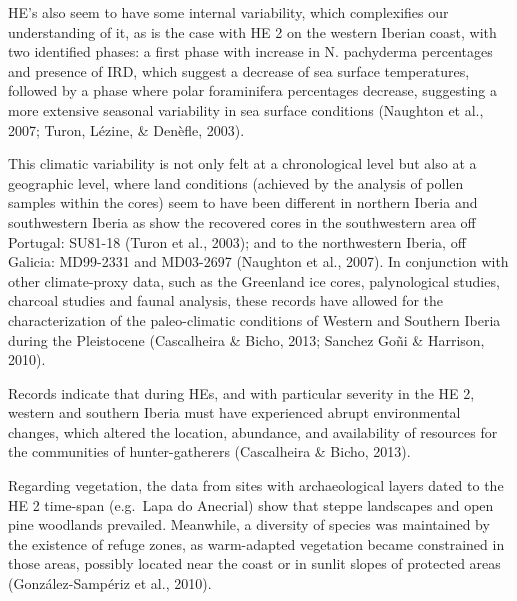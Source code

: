 \documentclass[12pt,twoside]{reedthesis}
\begin{document}
HE's also seem to have some internal variability, which complexifies our understanding of it, as is the case with HE 2 on the western Iberian coast, with two identified phases: a first phase with increase in N. pachyderma percentages and presence of IRD, which suggest a decrease of sea surface temperatures, followed by a phase where polar foraminifera percentages decrease, suggesting a more extensive seasonal variability in sea surface conditions (Naughton et al., 2007; Turon, Lézine, \& Denèfle, 2003).

This climatic variability is not only felt at a chronological level but also at a geographic level, where land conditions (achieved by the analysis of pollen samples within the cores) seem to have been different in northern Iberia and southwestern Iberia as show the recovered cores in the southwestern area off Portugal: SU81-18 (Turon et al., 2003); and to the northwestern Iberia, off Galicia: MD99-2331 and MD03-2697 (Naughton et al., 2007). In conjunction with other climate-proxy data, such as the Greenland ice cores, palynological studies, charcoal studies and faunal analysis, these records have allowed for the characterization of the paleo-climatic conditions of Western and Southern Iberia during the Pleistocene (Cascalheira \& Bicho, 2013; Sanchez Goñi \& Harrison, 2010).

Records indicate that during HEs, and with particular severity in the HE 2, western and southern Iberia must have experienced abrupt environmental changes, which altered the location, abundance, and availability of resources for the communities of hunter-gatherers (Cascalheira \& Bicho, 2013).

Regarding vegetation, the data from sites with archaeological layers dated to the HE 2 time-span (e.g.~Lapa do Anecrial) show that steppe landscapes and open pine woodlands prevailed. Meanwhile, a diversity of species was maintained by the existence of refuge zones, as warm-adapted vegetation became constrained in those areas, possibly located near the coast or in sunlit slopes of protected areas (González-Sampériz et al., 2010).
\end{document}
